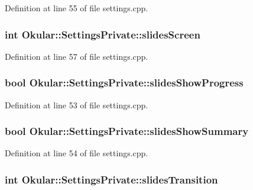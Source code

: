 Definition at line 55 of file settings.\+cpp.

\hypertarget{classOkular_1_1SettingsPrivate_a0889218d8b0d45ad198dc4535ecfe0ca}{
\subsubsection[{slides\+Screen}]{\setlength{\rightskip}{0pt plus 5cm}int Okular\+::\+Settings\+Private\+::slides\+Screen}}\label{classOkular_1_1SettingsPrivate_a0889218d8b0d45ad198dc4535ecfe0ca}


Definition at line 57 of file settings.\+cpp.

\hypertarget{classOkular_1_1SettingsPrivate_a9f7e1778a473ab4fca45f816a21d1254}{
\subsubsection[{slides\+Show\+Progress}]{\setlength{\rightskip}{0pt plus 5cm}bool Okular\+::\+Settings\+Private\+::slides\+Show\+Progress}}\label{classOkular_1_1SettingsPrivate_a9f7e1778a473ab4fca45f816a21d1254}


Definition at line 53 of file settings.\+cpp.

\hypertarget{classOkular_1_1SettingsPrivate_a15e8ffa873a442611e65c8a00c342c8f}{
\subsubsection[{slides\+Show\+Summary}]{\setlength{\rightskip}{0pt plus 5cm}bool Okular\+::\+Settings\+Private\+::slides\+Show\+Summary}}\label{classOkular_1_1SettingsPrivate_a15e8ffa873a442611e65c8a00c342c8f}


Definition at line 54 of file settings.\+cpp.

\hypertarget{classOkular_1_1SettingsPrivate_a0332fa4a91512006b7c4ddcc4e979b37}{
\subsubsection[{slides\+Transition}]{\setlength{\rightskip}{0pt plus 5cm}int Okular\+::\+Settings\+Private\+::slides\+Transition}}\label{classOkular_1_1SettingsPrivate_a0332fa4a91512006b7c4ddcc4e979b37}



